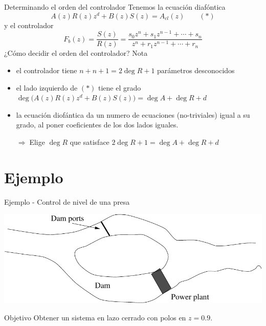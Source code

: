 \documentclass[presentation,aspectratio=169]{beamer}
\begin{document}
\begin{frame}[label={sec:org026f697}]{Determinando el orden del controlador}
Tenemos la ecuación diafóntica
   \[ A(z)R(z)z^{d} + B(z)S(z) = A_{cl}(z) \qquad (*) \]
y el controlador
\[F_b(z) = \frac{S(z)}{R(z)} = \frac{s_0z^n + s_1z^{n-1} + \cdots + s_n}{z^n + r_1 z^{n-1} + \cdots + r_n}\]
\alert{¿Cómo decidir el orden del controlador?} Nota
\begin{itemize}
\item el controlador tiene \(n+n+1 = 2\deg R + 1\) parámetros desconocidos
\item el lado izquierdo de \((*)\) tiene el grado \(\deg \big(A(z)R(z)z^d + B(z)S(z)\big) = \deg A + \deg R + d\)
\item la ecuación diofántica da un numero de ecuaciones (no-triviales) igual a su grado, al poner coeficientes de los dos lados iguales.

\alert{\(\Rightarrow\;\)Elige \(\deg R\) que satisface \(2\deg R + 1 = \deg A + \deg R + d\)}
\end{itemize}
\end{frame}


\section{Ejemplo}
\label{sec:org361cd3e}
\begin{frame}[label={sec:org1efb790}]{Ejemplo - Control de nivel de una presa}
\begin{center}
\includegraphics[width=0.5\linewidth]{../../figures/kraftverk}
\end{center}

\alert{Objetivo} Obtener un sistema en lazo cerrado con polos en \(z=0.9\).
\end{frame}
\end{document}
